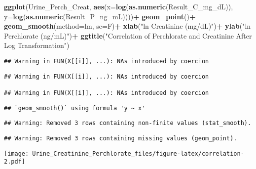 \documentclass[]{article}
\newenvironment{Shaded}{\begin{snugshade}}{\end{snugshade}}
\newcommand{\DataTypeTok}[1]{\textcolor[rgb]{0.13,0.29,0.53}{#1}}
\newcommand{\KeywordTok}[1]{\textcolor[rgb]{0.13,0.29,0.53}{\textbf{#1}}}
\newcommand{\NormalTok}[1]{#1}
\newcommand{\OperatorTok}[1]{\textcolor[rgb]{0.81,0.36,0.00}{\textbf{#1}}}
\newcommand{\StringTok}[1]{\textcolor[rgb]{0.31,0.60,0.02}{#1}}
\begin{document}
\begin{Shaded}
\begin{Highlighting}[]
\KeywordTok{ggplot}\NormalTok{(Urine_Perch_Creat, }\KeywordTok{aes}\NormalTok{(}\DataTypeTok{x=}\KeywordTok{log}\NormalTok{(}\KeywordTok{as.numeric}\NormalTok{(Result_C_mg_dL)), }\DataTypeTok{y=}\KeywordTok{log}\NormalTok{(}\KeywordTok{as.numeric}\NormalTok{(Result_P_ng_mL))))}\OperatorTok{+}
\StringTok{  }\KeywordTok{geom_point}\NormalTok{()}\OperatorTok{+}
\StringTok{  }\KeywordTok{geom_smooth}\NormalTok{(}\DataTypeTok{method=}\NormalTok{lm, }\DataTypeTok{se=}\NormalTok{F)}\OperatorTok{+}
\StringTok{  }\KeywordTok{xlab}\NormalTok{(}\StringTok{"ln Creatinine (mg/dL)"}\NormalTok{)}\OperatorTok{+}
\StringTok{  }\KeywordTok{ylab}\NormalTok{(}\StringTok{"ln Perchlorate (ng/mL)"}\NormalTok{)}\OperatorTok{+}
\StringTok{  }\KeywordTok{ggtitle}\NormalTok{(}\StringTok{"Correlation of Perchlorate and Creatinine After Log Transformation"}\NormalTok{)}
\end{Highlighting}
\end{Shaded}

\begin{verbatim}
## Warning in FUN(X[[i]], ...): NAs introduced by coercion
\end{verbatim}

\begin{verbatim}
## Warning in FUN(X[[i]], ...): NAs introduced by coercion

## Warning in FUN(X[[i]], ...): NAs introduced by coercion
\end{verbatim}

\begin{verbatim}
## `geom_smooth()` using formula 'y ~ x'
\end{verbatim}

\begin{verbatim}
## Warning: Removed 3 rows containing non-finite values (stat_smooth).
\end{verbatim}

\begin{verbatim}
## Warning: Removed 3 rows containing missing values (geom_point).
\end{verbatim}

\texttt{[image: Urine\_Creatinine\_Perchlorate\_files/figure-latex/correlation-2.pdf]}

\begin{Shaded}
\end{Shaded}
\end{document}

